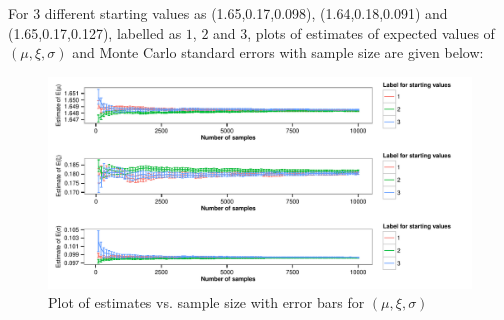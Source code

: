 \documentclass[12pt]{article}
\begin{document}
\begin{enumerate}[label=(\alph*)]
\begin{enumerate}[label=(\roman*)]
For 3 different starting values as (1.65,0.17,0.098), (1.64,0.18,0.091) and (1.65,0.17,0.127), labelled as $1$, $2$ and $3$, plots of estimates of expected values of $(\mu,\xi,\sigma)$ and Monte Carlo standard errors with sample size are given below:
\begin{figure}[H]
\begin{centering}
\includegraphics{aua257HW3-005}
\caption{Plot of estimates vs. sample size with error bars for $(\mu,\xi,\sigma)$}
\end{centering}
\end{figure}


\end{enumerate}
\end{enumerate}
\end{document}
